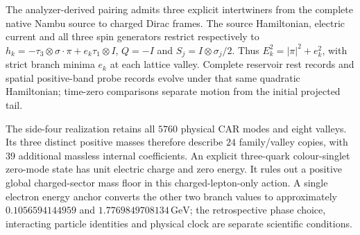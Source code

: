 The analyzer-derived pairing admits three explicit intertwiners from
the complete native Nambu source to charged Dirac frames. The source
Hamiltonian, electric current and all three spin generators restrict
respectively to $h_k=-\tau_3\otimes\sigma\cdot\pi+e_k\tau_1\otimes I$,
$Q=-I$ and $S_j=I\otimes\sigma_j/2$. Thus
$E_k^2=|\pi|^2+e_k^2$, with strict branch minima $e_k$ at each lattice
valley. Complete reservoir rest records and spatial positive-band probe
records evolve under that same quadratic Hamiltonian; time-zero
comparisons separate motion from the initial projected tail.

The side-four realization retains all $5760$ physical CAR modes and
eight valleys. Its three distinct positive masses therefore describe
$24$ family/valley copies, with $39$ additional massless internal
coefficients. An explicit three-quark colour-singlet zero-mode state has
unit electric charge and zero energy. It rules out a positive global
charged-sector mass floor in this charged-lepton-only action. A single
electron energy anchor converts the other two branch values to
approximately $0.1056594144959$ and $1.7769849708134\,\mathrm{GeV}$;
the retrospective phase choice, interacting particle identities and
physical clock are separate scientific conditions.

